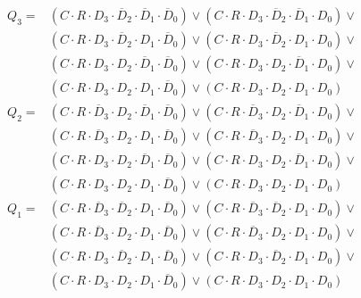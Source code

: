 \documentclass[oneside,a4paper,14pt]{extarticle}
\begin{document}
\begin{align*}
  Q_3 = {} & (C \cdot R \cdot D_3 \cdot \overline{D}_2 \cdot \overline{D}_1 \cdot \overline{D}_0) \vee
             (C \cdot R \cdot D_3 \cdot \overline{D}_2 \cdot \overline{D}_1 \cdot D_0) \vee \\
           & (C \cdot R \cdot D_3 \cdot \overline{D}_2 \cdot D_1 \cdot \overline{D}_0) \vee
             (C \cdot R \cdot D_3 \cdot \overline{D}_2 \cdot D_1 \cdot D_0) \vee \\
           & (C \cdot R \cdot D_3 \cdot D_2 \cdot \overline{D}_1 \cdot \overline{D}_0) \vee
             (C \cdot R \cdot D_3 \cdot D_2 \cdot \overline{D}_1 \cdot D_0) \vee \\
           & (C \cdot R \cdot D_3 \cdot D_2 \cdot D_1 \cdot \overline{D}_0) \vee
             (C \cdot R \cdot D_3 \cdot D_2 \cdot D_1 \cdot D_0) \\[3mm]
  Q_2 = {} & (C \cdot R \cdot \overline{D}_3 \cdot D_2 \cdot \overline{D}_1 \cdot \overline{D}_0) \vee
             (C \cdot R \cdot \overline{D}_3 \cdot D_2 \cdot \overline{D}_1 \cdot D_0) \vee \\
           & (C \cdot R \cdot \overline{D}_3 \cdot D_2 \cdot D_1 \cdot \overline{D}_0) \vee
             (C \cdot R \cdot \overline{D}_3 \cdot D_2 \cdot D_1 \cdot D_0) \vee \\
           & (C \cdot R \cdot D_3 \cdot D_2 \cdot \overline{D}_1 \cdot \overline{D}_0) \vee
             (C \cdot R \cdot D_3 \cdot D_2 \cdot \overline{D}_1 \cdot D_0) \vee \\
           & (C \cdot R \cdot D_3 \cdot D_2 \cdot D_1 \cdot \overline{D}_0) \vee
             (C \cdot R \cdot D_3 \cdot D_2 \cdot D_1 \cdot D_0) \\[3mm]
  Q_1 = {} & (C \cdot R \cdot \overline{D}_3 \cdot \overline{D}_2 \cdot D_1 \cdot \overline{D}_0) \vee
             (C \cdot R \cdot \overline{D}_3 \cdot \overline{D}_2 \cdot D_1 \cdot D_0) \vee \\
           & (C \cdot R \cdot \overline{D}_3 \cdot D_2 \cdot D_1 \cdot \overline{D}_0) \vee
             (C \cdot R \cdot \overline{D}_3 \cdot D_2 \cdot D_1 \cdot D_0) \vee \\
           & (C \cdot R \cdot D_3 \cdot \overline{D}_2 \cdot D_1 \cdot \overline{D}_0) \vee
             (C \cdot R \cdot D_3 \cdot \overline{D}_2 \cdot D_1 \cdot D_0) \vee \\
           & (C \cdot R \cdot D_3 \cdot D_2 \cdot D_1 \cdot \overline{D}_0) \vee
             (C \cdot R \cdot D_3 \cdot D_2 \cdot D_1 \cdot D_0) \\[3mm]

\end{align*}
\end{document}
